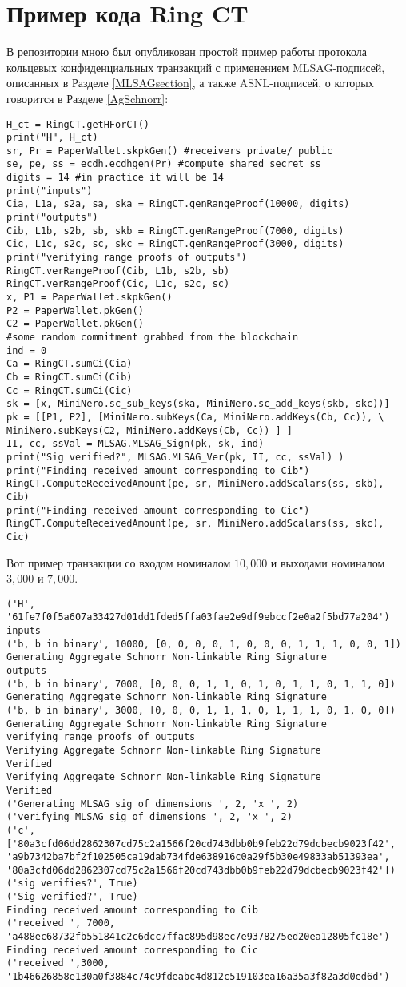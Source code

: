 \documentclass{mrl}
\theoremstyle{definition}
\numberwithin{thm}{section}
\begin{document}
\section{Пример кода Ring CT}
В репозитории \cite{Snoe} мною был опубликован простой пример работы протокола кольцевых конфиденциальных транзакций с применением MLSAG-подписей, описанных в Разделе \ref{MLSAGsection}, а также ASNL-подписей, о которых говорится в Разделе \ref{AgSchnorr}:
\begin{verbatim}
H_ct = RingCT.getHForCT()
print("H", H_ct)
sr, Pr = PaperWallet.skpkGen() #receivers private/ public
se, pe, ss = ecdh.ecdhgen(Pr) #compute shared secret ss
digits = 14 #in practice it will be 14
print("inputs")
Cia, L1a, s2a, sa, ska = RingCT.genRangeProof(10000, digits)
print("outputs")
Cib, L1b, s2b, sb, skb = RingCT.genRangeProof(7000, digits)
Cic, L1c, s2c, sc, skc = RingCT.genRangeProof(3000, digits)
print("verifying range proofs of outputs")
RingCT.verRangeProof(Cib, L1b, s2b, sb)
RingCT.verRangeProof(Cic, L1c, s2c, sc)
x, P1 = PaperWallet.skpkGen()
P2 = PaperWallet.pkGen()
C2 = PaperWallet.pkGen()
#some random commitment grabbed from the blockchain
ind = 0
Ca = RingCT.sumCi(Cia)
Cb = RingCT.sumCi(Cib)
Cc = RingCT.sumCi(Cic)
sk = [x, MiniNero.sc_sub_keys(ska, MiniNero.sc_add_keys(skb, skc))]
pk = [[P1, P2], [MiniNero.subKeys(Ca, MiniNero.addKeys(Cb, Cc)), \
MiniNero.subKeys(C2, MiniNero.addKeys(Cb, Cc)) ] ]
II, cc, ssVal = MLSAG.MLSAG_Sign(pk, sk, ind)
print("Sig verified?", MLSAG.MLSAG_Ver(pk, II, cc, ssVal) )
print("Finding received amount corresponding to Cib")
RingCT.ComputeReceivedAmount(pe, sr, MiniNero.addScalars(ss, skb), Cib)
print("Finding received amount corresponding to Cic")
RingCT.ComputeReceivedAmount(pe, sr, MiniNero.addScalars(ss, skc), Cic)
\end{verbatim}
Вот пример транзакции со входом номиналом $10,000$ и выходами номиналом $3,000$ и $7,000$.
\begin{verbatim}
('H', '61fe7f0f5a607a33427d01dd1fded5ffa03fae2e9df9ebccf2e0a2f5bd77a204')
inputs
('b, b in binary', 10000, [0, 0, 0, 0, 1, 0, 0, 0, 1, 1, 1, 0, 0, 1])
Generating Aggregate Schnorr Non-linkable Ring Signature
outputs
('b, b in binary', 7000, [0, 0, 0, 1, 1, 0, 1, 0, 1, 1, 0, 1, 1, 0])
Generating Aggregate Schnorr Non-linkable Ring Signature
('b, b in binary', 3000, [0, 0, 0, 1, 1, 1, 0, 1, 1, 1, 0, 1, 0, 0])
Generating Aggregate Schnorr Non-linkable Ring Signature
verifying range proofs of outputs
Verifying Aggregate Schnorr Non-linkable Ring Signature
Verified
Verifying Aggregate Schnorr Non-linkable Ring Signature
Verified
('Generating MLSAG sig of dimensions ', 2, 'x ', 2)
('verifying MLSAG sig of dimensions ', 2, 'x ', 2)
('c',
['80a3cfd06dd2862307cd75c2a1566f20cd743dbb0b9feb22d79dcbecb9023f42',
'a9b7342ba7bf2f102505ca19dab734fde638916c0a29f5b30e49833ab51393ea',
'80a3cfd06dd2862307cd75c2a1566f20cd743dbb0b9feb22d79dcbecb9023f42'])
('sig verifies?', True)
('Sig verified?', True)
Finding received amount corresponding to Cib
('received ', 7000,
'a488ec68732fb551841c2c6dcc7ffac895d98ec7e9378275ed20ea12805fc18e')
Finding received amount corresponding to Cic
('received ',3000,
'1b46626858e130a0f3884c74c9fdeabc4d812c519103ea16a35a3f82a3d0ed6d')
\end{verbatim}
\end{document}
